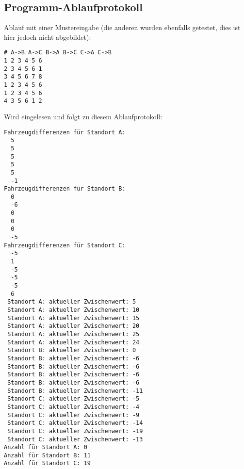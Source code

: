 \subsection{Programm-Ablaufprotokoll}
Ablauf mit einer Mustereingabe (die anderen wurden ebenfalls getestet, dies ist hier jedoch nicht abgebildet):
\lstset{language=Python}
\lstset{basicstyle=\footnotesize}
\begin{lstlisting}
# A->B A->C B->A B->C C->A C->B
1 2 3 4 5 6
2 3 4 5 6 1
3 4 5 6 7 8
1 2 3 4 5 6
1 2 3 4 5 6
4 3 5 6 1 2
\end{lstlisting}
Wird eingelesen und folgt zu diesem Ablaufprotokoll:
\lstset{language=Scala}
\lstset{basicstyle=\footnotesize}
\begin{lstlisting}
Fahrzeugdifferenzen für Standort A: 
  5
  5
  5
  5
  5
  -1
Fahrzeugdifferenzen für Standort B: 
  0
  -6
  0
  0
  0
  -5
Fahrzeugdifferenzen für Standort C: 
  -5
  1
  -5
  -5
  -5
  6
 Standort A: aktueller Zwischenwert: 5
 Standort A: aktueller Zwischenwert: 10
 Standort A: aktueller Zwischenwert: 15
 Standort A: aktueller Zwischenwert: 20
 Standort A: aktueller Zwischenwert: 25
 Standort A: aktueller Zwischenwert: 24
 Standort B: aktueller Zwischenwert: 0
 Standort B: aktueller Zwischenwert: -6
 Standort B: aktueller Zwischenwert: -6
 Standort B: aktueller Zwischenwert: -6
 Standort B: aktueller Zwischenwert: -6
 Standort B: aktueller Zwischenwert: -11
 Standort C: aktueller Zwischenwert: -5
 Standort C: aktueller Zwischenwert: -4
 Standort C: aktueller Zwischenwert: -9
 Standort C: aktueller Zwischenwert: -14
 Standort C: aktueller Zwischenwert: -19
 Standort C: aktueller Zwischenwert: -13
Anzahl für Standort A: 0
Anzahl für Standort B: 11
Anzahl für Standort C: 19
\end{lstlisting}

